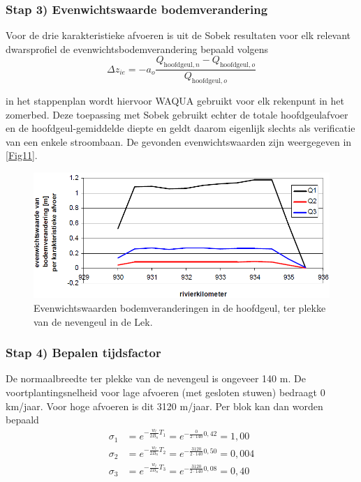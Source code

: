 \subsubsection*{Stap 3) Evenwichtswaarde bodemverandering}

Voor de drie karakteristieke afvoeren is uit de Sobek resultaten voor elk relevant dwarsprofiel de evenwichtsbodemverandering bepaald volgens
%
\begin{equation}
\Delta z_{ie} = -a_o \frac{Q_{\text{hoofdgeul},n} - Q_{\text{hoofdgeul},o}}{Q_{\text{hoofdgeul},o}}
\end{equation}

\Note in het stappenplan wordt hiervoor WAQUA gebruikt voor elk rekenpunt in het zomerbed.
Deze toepassing met Sobek gebruikt echter de totale hoofdgeulafvoer en de hoofdgeul-gemiddelde diepte en geldt daarom eigenlijk slechts als verificatie van een enkele stroombaan.
De gevonden evenwichtswaarden zijn weergegeven in \autoref{Fig11}.

\begin{figure}
\includegraphics[width=\columnwidth]{figures/Fig11.png}
\caption{Evenwichtswaarden bodemveranderingen in de hoofdgeul, ter plekke van de nevengeul in de Lek.}
\label{Fig11}
\end{figure}

\subsubsection*{Stap 4) Bepalen tijdsfactor}

De normaalbreedte ter plekke van de nevengeul is ongeveer 140 m.
De voortplantingsnelheid voor lage afvoeren (met gesloten stuwen) bedraagt 0 km/jaar.
Voor hoge afvoeren is dit 3120 m/jaar. Per blok kan dan worden bepaald
%
\begin{align}
\sigma_1 &= e^{-\frac{w_l}{2B_n}T_1} = e^{-\frac{0}{2 \cdot 140} 0,42} = 1,00 \\
\sigma_2 &= e^{-\frac{w_l}{2B_n}T_2} = e^{-\frac{3120}{2 \cdot 140} 0,50} = 0,004 \\
\sigma_3 &= e^{-\frac{w_l}{2B_n}T_3} = e^{-\frac{3120}{2 \cdot 140} 0,08} = 0,40
\end{align}

